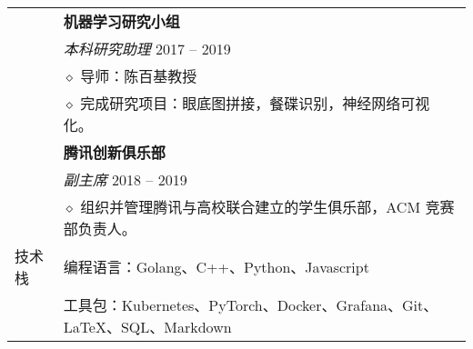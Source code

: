 \documentclass[letterpaper, 10pt]{article}
\begin{document}
\begin{longtable}{p{1.3in}p{5.0in}}
& \textbf{机器学习研究小组} \\
& \textit{本科研究助理} \hfill 2017 -- 2019 \\
& $\diamond$ 导师：陈百基教授 \\
& $\diamond$ 完成研究项目：眼底图拼接，餐碟识别，神经网络可视化。 \\

& \textbf{腾讯创新俱乐部} \\
& \textit{副主席} \hfill 2018 -- 2019 \\
& $\diamond$ 组织并管理腾讯与高校联合建立的学生俱乐部，ACM 竞赛部负责人。 \\


\nohyphens{技术栈}
& 编程语言：Golang、C++、Python、Javascript \\
& 工具包：Kubernetes、PyTorch、Docker、Grafana、Git、\LaTeX、SQL、Markdown \\





\end{longtable}
\end{document}
